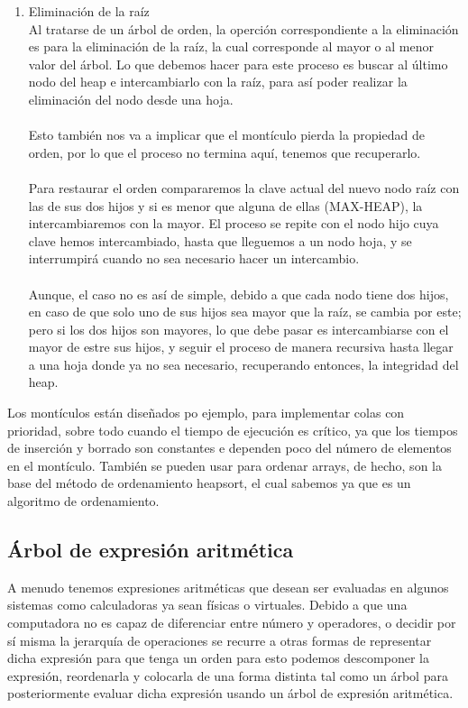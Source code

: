 \documentclass{report}
\begin{document}
\begin{enumerate}
    \item Eliminación de la raíz\\
    Al tratarse de un árbol de orden, la operción correspondiente a la eliminación es para la eliminación de la raíz, la cual corresponde al mayor o al menor valor del árbol. Lo que debemos hacer para este proceso es buscar al último nodo del heap e intercambiarlo con la raíz, para así poder realizar la eliminación del nodo desde una hoja.\\\\
    Esto también nos va a implicar que el montículo pierda la propiedad de orden, por lo que el proceso no termina aquí, tenemos que recuperarlo.\\\\
    Para restaurar el orden compararemos la clave actual del nuevo nodo raíz con las de sus dos hijos y si es menor que alguna de ellas (MAX-HEAP), la intercambiaremos con la mayor. El proceso se repite con el nodo hijo cuya clave hemos intercambiado, hasta que lleguemos a un nodo hoja, y se interrumpirá cuando no sea necesario hacer un intercambio.\\\\
    Aunque, el caso no es así de simple, debido a que cada nodo tiene dos hijos, en caso de que solo uno de sus hijos sea mayor que la raíz, se cambia por este; pero si los dos hijos son mayores, lo que debe pasar es intercambiarse con el mayor de estre sus hijos, y seguir el proceso de manera recursiva hasta llegar a una hoja donde ya no sea necesario, recuperando entonces, la integridad del heap.
    
\end{enumerate}

Los montículos están diseñados po ejemplo, para implementar colas con prioridad, sobre todo cuando el tiempo de ejecución es crítico, ya que los tiempos de inserción y borrado son constantes e dependen poco del número de elementos en el montículo.
También se pueden usar para ordenar arrays, de hecho, son la base del método de ordenamiento heapsort, el cual sabemos ya que es un algoritmo de ordenamiento.

\subsection{Árbol de expresión aritmética}
A menudo tenemos expresiones aritméticas que desean ser evaluadas en algunos sistemas como calculadoras ya sean físicas o virtuales. Debido a que una computadora no es capaz de diferenciar entre número y operadores, o decidir por sí misma la jerarquía de operaciones se recurre a otras formas de representar dicha expresión para que tenga un orden para esto podemos descomponer la expresión, reordenarla y colocarla de una forma distinta tal como un árbol para posteriormente evaluar dicha expresión usando un árbol de expresión aritmética.\\\
\end{document}

